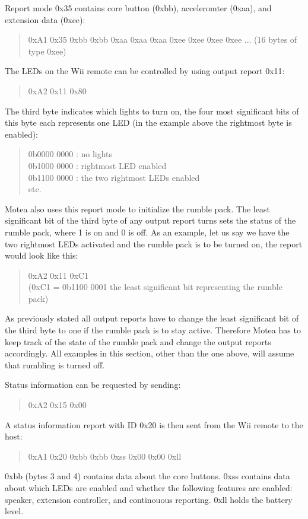 Report mode 0x35 contains core button (0xbb), acceleromter (0xaa), and extension data (0xee):
\begin{quote}
0xA1 0x35 0xbb 0xbb 0xaa 0xaa 0xaa 0xee 0xee 0xee 0xee ... (16 bytes of type 0xee)
\end{quote}

The LEDs on the Wii remote can be controlled by using output report 0x11:
\begin{quote}
0xA2 0x11 0x80
\end{quote}
The third byte indicates which lights to turn on, the four most significant bits of this byte each represents one LED (in the example above the rightmost byte is enabled):
\begin{quote}
0b0000 0000 : no lights\\
0b1000 0000 : rightmost LED enabled\\
0b1100 0000 : the two rightmost LEDs enabled\\
etc.
\end{quote}
Motea also uses this report mode to initialize the rumble pack. The least significant bit of the third byte of any output report turns sets the status of the rumble pack, where 1 is on and 0 is off. As an example, let us say we have the two rightmost LEDs activated and the rumble pack is to be turned on, the report would look like this:
\begin{quote}	
0xA2 0x11 0xC1\\
(0xC1 = 0b1100 0001 the least significant bit representing the rumble pack)
\end{quote}
As previously stated all output reports have to change the least significant bit of the third byte to one if the rumble pack is to stay active. Therefore Motea has to keep track of the state of the rumble pack and change the output reports accordingly. All examples in this section, other than the one above, will assume that rumbling is turned off.

Status information can be requested by sending:
\begin{quote}
0xA2 0x15 0x00
\end{quote}
A status information report with ID 0x20 is then sent from the Wii remote to the host:
\begin{quote}
0xA1 0x20 0xbb 0xbb 0xss 0x00 0x00 0xll
\end{quote}
0xbb (bytes 3 and 4) contains data about the core buttons. 0xss contains data about which LEDs are enabled and whether the following features are enabled: speaker, extension controller, and continouous reporting. 0xll holds the battery level. 

